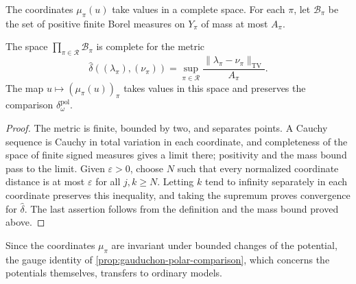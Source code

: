 The coordinates $\mu_\pi(u)$ take values in a complete space. For each $\pi$, let $\mathscr B_\pi$ be the set of positive finite Borel measures on $Y_\pi$ of mass at most $A_\pi$.

\begin{proposition}\label{prop:polar-trace-coordinate-completeness}
The space $\prod_{\pi\in\mathscr R}\mathscr B_\pi$ is complete for the metric
\[
 \widehat\delta((\lambda_\pi),(\nu_\pi))
       =\sup_{\pi\in\mathscr R}
          \frac{\|\lambda_\pi-\nu_\pi\|_{\mathrm{TV}}}{A_\pi}.
\]
The map $u\mapsto(\mu_\pi(u))_\pi$ takes values in this space and preserves the comparison $\delta_\omega^{\mathrm{pol}}$.
\end{proposition}
\begin{proof}
The metric is finite, bounded by two, and separates points. A Cauchy sequence is Cauchy in total variation in each coordinate, and completeness of the space of finite signed measures gives a limit there; positivity and the mass bound pass to the limit. Given $\varepsilon>0$, choose $N$ such that every normalized coordinate distance is at most $\varepsilon$ for all $j,k\geq N$. Letting $k$ tend to infinity separately in each coordinate preserves this inequality, and taking the supremum proves convergence for $\widehat\delta$. The last assertion follows from the definition and the mass bound proved above.
\end{proof}

Since the coordinates $\mu_\pi$ are invariant under bounded changes of the potential, the gauge identity of \cref{prop:gauduchon-polar-comparison}, which concerns the potentials themselves, transfers to ordinary models.

